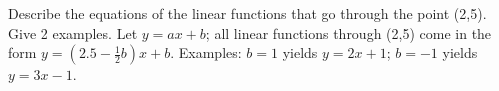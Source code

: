 {Describe the equations of the linear functions that go through the point (2,5). Give 2 examples.}
{Let $y = ax+b$; all linear functions through (2,5) come in the form $y = (2.5-\frac12b)x+b$. Examples: $b=1$ yields $y = 2x+1$; $b=-1$ yields $y=3x-1$.
}